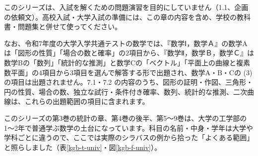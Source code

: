 このシリーズは、入試を解くための問題演習を目的にしていません（1.1、企画の依頼文）。高校入試・大学入試の準備には、この章の内容を含め、学校の教科書・問題集と併せて使ってください。

なお、令和7年度の大学入学共通テストの数学では、『数学Ⅰ，数学Ａ』の数学Aは「図形の性質」「場合の数と確率」の2項目から、『数学Ⅱ，数学Ｂ，数学Ｃ』は数学Bの「数列」「統計的な推測」と数学Cの「ベクトル」「平面上の曲線と複素数平面」の4項目から3項目を選んで解答する形で出題され、数学A・B・Cの (3) の項目は出題されません。7.1・7.2 の内容のうち、図形の証明・作図、三角形・円の性質、場合の数、独立な試行・条件付き確率、数列、統計的な推測、二次曲線は、これらの出題範囲の項目に含まれます。

\label{kgb-ch8}

このシリーズの第3巻の統計の章、第4巻の後半、第5〜9巻は、大学の工学部の1〜2年で普通学ぶ数学の土台になっています。科目の名前・中身・学年は大学や学科ごとに違うので、ここでは実際のシラバスの例から拾った「よくある範囲」と照らしました（表\ref{kgb-t-univ}・図\ref{kgb-f-univ}）。


